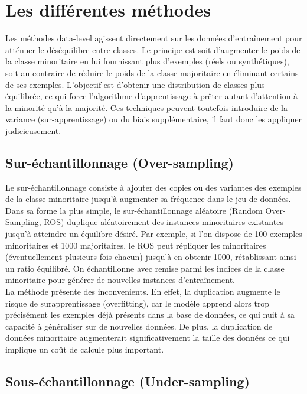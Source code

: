 \documentclass{article}
\begin{document}
\section{Les différentes méthodes}

Les méthodes data-level agissent directement sur les données d’entraînement pour atténuer le
déséquilibre entre classes. Le principe est soit d’augmenter le poids de la classe minoritaire en lui
fournissant plus d’exemples (réels ou synthétiques), soit au contraire de réduire le poids de la classe
majoritaire en éliminant certains de ses exemples. L’objectif est d’obtenir une distribution de classes
plus équilibrée, ce qui force l’algorithme d’apprentissage à prêter autant d’attention à la minorité qu’à la
majorité. Ces techniques peuvent toutefois introduire de la variance (sur-apprentissage) ou du
biais supplémentaire, il faut donc les appliquer judicieusement.

\subsection{Sur-échantillonnage (Over-sampling)}

Le sur-échantillonnage consiste à ajouter des copies ou des variantes des exemples de
la classe minoritaire jusqu’à augmenter sa fréquence dans le jeu de données. Dans sa forme la plus
simple, le sur-échantillonnage aléatoire (Random Over-Sampling, ROS) duplique aléatoirement des
instances minoritaires existantes jusqu’à atteindre un équilibre désiré. Par exemple, si l’on dispose
de 100 exemples minoritaires et 1000 majoritaires, le ROS peut répliquer les minoritaires
(éventuellement plusieurs fois chacun) jusqu’à en obtenir 1000, rétablissant ainsi un ratio équilibré. On échantillonne avec remise parmi les indices de la classe minoritaire pour
générer de nouvelles instances d’entraînement.
\\

La méthode présente des inconvenients. En effet, la duplication augmente le risque de surapprentissage (overfitting), car le modèle apprend alors trop précisément les exemples déjà présents dans la base de données, ce qui nuit à sa capacité à généraliser sur de nouvelles données.
De plus, la duplication de données minoritaire augmenterait significativement la taille des données ce qui implique un coût de calcule plus important.


\subsection{Sous-échantillonnage (Under-sampling)}
\end{document}
